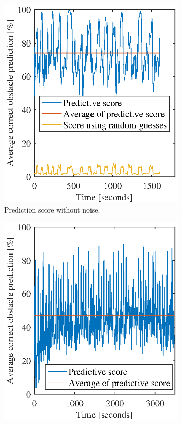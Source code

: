 \begin{figure}[htbp]
    \centering
    \begin{subfigure}[t]{0.49\textwidth}
        \includegraphics[width=1.0\textwidth]{chapters/mapping_of_dynamic_areas/figures/fremen_avg_miss_no_noise}	
        \caption{Prediction score without noise.}
        \label{fig:fremen_avg_miss_no_noise}
    \end{subfigure}
    \begin{subfigure}[t]{0.49\textwidth}
        \includegraphics[width=1.0\textwidth]{chapters/mapping_of_dynamic_areas/figures/fremen_avg_miss_with_noise}

\end{subfigure}
\end{figure}

